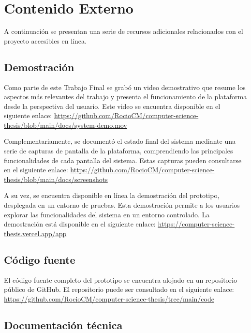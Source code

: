 \chapter{Contenido Externo}
\label{cp:annex-content}

\parindent0pt

A continuación se presentan una serie de recursos adicionales relacionados con el proyecto accesibles en línea.

\section{Demostración}
\label{sec:results-demo}

Como parte de este Trabajo Final se grabó un video demostrativo que resume los aspectos más relevantes del trabajo y presenta el funcionamiento de la plataforma desde la perspectiva del usuario. Este video se encuentra disponible en el siguiente enlace: 
\url{https://github.com/RocioCM/computer-science-thesis/blob/main/docs/system-demo.mov} %

Complementariamente, se documentó el estado final del sistema mediante una serie de capturas de pantalla de la plataforma, comprendiendo las principales funcionalidades de cada pantalla del sistema. Estas capturas pueden consultarse en el siguiente enlace: \url{https://github.com/RocioCM/computer-science-thesis/blob/main/docs/screenshots} %

A su vez, se encuentra disponible en línea la demostración del prototipo, desplegada en un entorno de pruebas. Esta demostración permite a los usuarios explorar las funcionalidades del sistema en un entorno controlado. La demostración está disponible en el siguiente enlace: \url{https://computer-science-thesis.vercel.app/app}

\section{Código fuente}
\label{sec:source-code}

El código fuente completo del prototipo se encuentra alojado en un repositorio público de GitHub. El repositorio puede ser consultado en el siguiente enlace: \url{https://github.com/RocioCM/computer-science-thesis/tree/main/code}

\section{Documentación técnica}
\label{sec:technical-docs}

